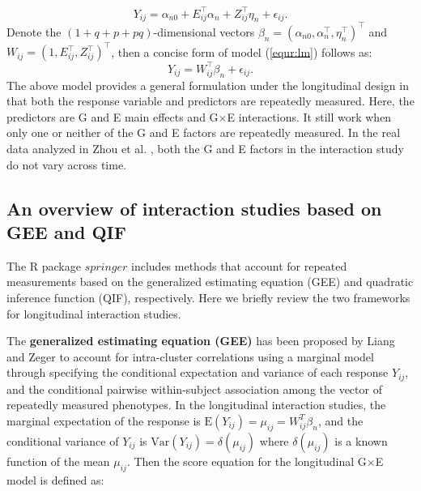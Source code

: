 \documentclass[12pt]{article}
\begin{document}
\begin{equation*}
	Y_{ij}=\alpha_{n0}+E_{ij}^\top \alpha_n+Z_{ij}^\top \eta_n +\epsilon_{ij}.
\end{equation*}
Denote the $ (1+q+p+pq)$-dimensional vectors $\beta_n=(\alpha_{n0},\alpha_n^\top,\eta_n^\top)^\top$ and $W_{ij}=(1,E_{ij}^\top,Z_{ij}^\top)^\top$, then a concise form of model (\ref{equr:lm}) follows as:
\begin{equation*}
	Y_{ij}=W_{ij}^\top \beta_n +\epsilon_{ij}.
\end{equation*}
The above model provides a general formulation under the longitudinal design in that both the response variable and predictors are repeatedly measured. Here, the predictors are G and E main effects and G$\times$E interactions. It still work when only one or neither of the G and E factors are repeatedly measured. In the real data analyzed in Zhou et al. \cite{zhou2022sparse}, both the G and E factors in the interaction study do not vary across time. 


\subsection{An overview of interaction studies based on GEE and QIF}\label{sec:3.2}

The R package \href{https://CRAN.R-project.org/package=springer}{$springer$}     
\cite{SP} includes methods that account for repeated measurements based on the generalized estimating equation (GEE) and quadratic inference function (QIF), respectively. Here we briefly review the two frameworks for longitudinal interaction studies. 

The \textbf{generalized estimating equation (GEE)} has been proposed by Liang and Zeger\cite{LZ} to account for intra-cluster correlations using a marginal model through specifying the conditional expectation and variance of each response $Y_{ij}$, and the conditional pairwise within-subject association among the vector of repeatedly measured phenotypes. In the longitudinal interaction studies, the marginal expectation of the response is $\text{E}(Y_{ij})=\mu_{ij}=W_{ij}^T\beta_n$, and the conditional variance of $Y_{ij}$ is $\text{Var}(Y_{ij})=\delta(\mu_{ij})$ where $\delta(\mu_{ij})$ is a known function of the mean $\mu_{ij}$. Then the score equation for the longitudinal G$\times$E model is defined as:
\end{document}
